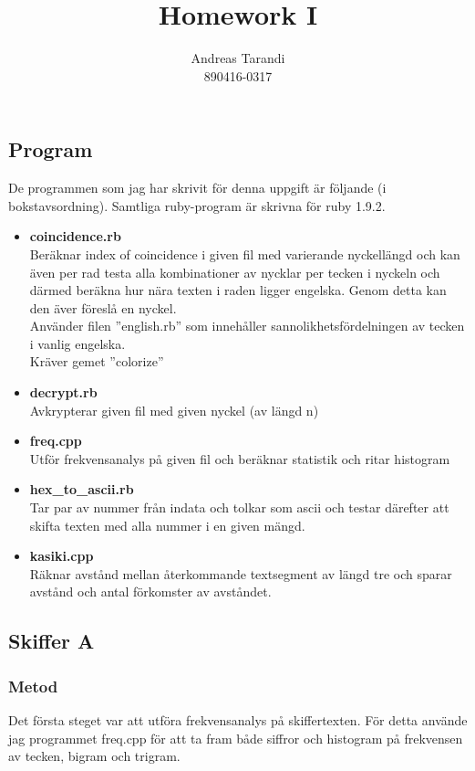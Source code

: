 \documentclass[a4paper,11pt]{article}
\author{Andreas Tarandi\\890416-0317}
\title{Homework I}
\begin{document}
	\maketitle

	\section{}
		\subsection{Program}
			De programmen som jag har skrivit för denna uppgift är följande (i bokstavsordning). Samtliga ruby-program är skrivna för ruby 1.9.2.
			\begin{itemize}
				\item \textbf{coincidence.rb}	\\
					Beräknar index of coincidence i given fil med varierande nyckellängd och kan även per rad testa alla kombinationer av nycklar per tecken i nyckeln och därmed beräkna hur nära texten i raden ligger engelska. Genom detta kan den äver föreslå en nyckel.\\
					Använder filen ''english.rb'' som innehåller sannolikhetsfördelningen av tecken i vanlig engelska.
					\\
					Kräver gemet ''colorize''	
				\item \textbf{decrypt.rb}	\\
					Avkrypterar given fil med given nyckel (av längd n)
				\item \textbf{freq.cpp}\\
					Utför frekvensanalys på given fil och beräknar statistik och ritar histogram
				\item \textbf{hex\_to\_ascii.rb}\\
					Tar par av nummer från indata och tolkar som ascii och testar därefter att skifta texten med alla nummer i en given mängd. 
				\item \textbf{kasiki.cpp}	\\
					Räknar avstånd mellan återkommande textsegment av längd tre och sparar avstånd och antal förkomster av avståndet.
			\end{itemize}

		\subsection{Skiffer A}
			\subsubsection{Metod}
			Det första steget var att utföra frekvensanalys på skiffertexten. För detta använde jag programmet freq.cpp för att 
			ta fram både siffror och histogram på frekvensen av tecken, bigram och trigram.
\end{document}
